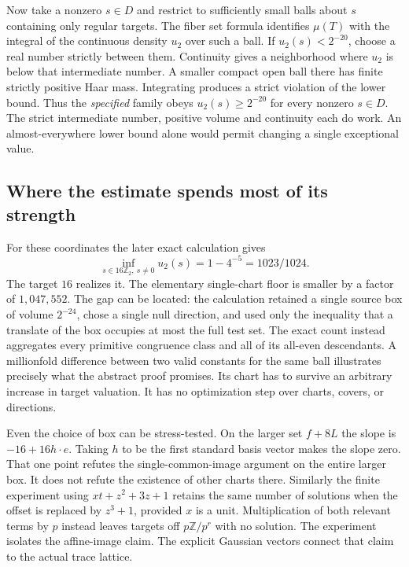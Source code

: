 \documentclass[12pt,letterpaper]{article}
\begin{document}
Now take a nonzero $s\in D$ and restrict to sufficiently small balls about $s$ containing only regular targets. The fiber set formula identifies $\mu(T)$ with the integral of the continuous density $u_2$ over such a ball. If $u_2(s)<2^{-20}$, choose a real number strictly between them. Continuity gives a neighborhood where $u_2$ is below that intermediate number. A smaller compact open ball there has finite strictly positive Haar mass. Integrating produces a strict violation of the lower bound. Thus the \emph{specified} family obeys $u_2(s)\ge2^{-20}$ for every nonzero $s\in D$. The strict intermediate number, positive volume and continuity each do work. An almost-everywhere lower bound alone would permit changing a single exceptional value.

\subsection{Where the estimate spends most of its strength}
For these coordinates the later exact calculation gives
\[
       \inf_{s\in16\mathbb Z_2,\ s\ne0}u_2(s)=1-4^{-5}=1023/1024 .
\]
The target $16$ realizes it. The elementary single-chart floor is smaller by a factor of $1{,}047{,}552$. The gap can be located: the calculation retained a single source box of volume $2^{-24}$, chose a single null direction, and used only the inequality that a translate of the box occupies at most the full test set. The exact count instead aggregates every primitive congruence class and all of its all-even descendants. A millionfold difference between two valid constants for the same ball illustrates precisely what the abstract proof promises. Its chart has to survive an arbitrary increase in target valuation. It has no optimization step over charts, covers, or directions.

Even the choice of box can be stress-tested. On the larger set $f+8L$ the slope is $-16+16h\cdot e$. Taking $h$ to be the first standard basis vector makes the slope zero. That one point refutes the single-common-image argument on the entire larger box. It does not refute the existence of other charts there. Similarly the finite experiment using $xt+z^2+3z+1$ retains the same number of solutions when the offset is replaced by $z^3+1$, provided $x$ is a unit. Multiplication of both relevant terms by $p$ instead leaves targets off $p\mathbb Z/p^r$ with no solution. The experiment isolates the affine-image claim. The explicit Gaussian vectors connect that claim to the actual trace lattice.
\end{document}
